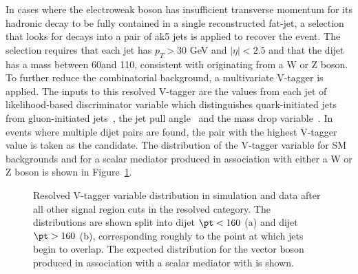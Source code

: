 In cases where the electroweak boson has insufficient transverse momentum for its hadronic
decay to be fully contained in a single reconstructed fat-jet, a selection that looks for decays 
into a pair of ak5 jets is applied to recover the event. 
The selection requires that each jet has $p_T>30$ GeV and $|\eta|<2.5$ and that the dijet has a mass between 60\gev and 110\gev, consistent with originating 
from a W or Z boson. To further reduce the combinatorial background, a
multivariate V-tagger is applied. The inputs to this resolved V-tagger are the values from each jet of likelihood-based discriminator variable 
which distinguishes quark-initiated jets from gluon-initiated
jets~\cite{JME-14-002}, the jet pull angle~\cite{Gallicchio:2010sw}
and the mass drop variable~\cite{Izaguirre:2014ira}. In events 
where multiple dijet pairs are found, the pair with the highest V-tagger value is taken as the candidate. The distribution of the V-tagger variable for SM backgrounds and for a scalar mediator
produced in association with either a W or Z boson is shown in Figure~\ref{fig:vtagger}.
\begin{figure}[hbtp]\begin{center}
 \caption{
Resolved V-tagger variable distribution in simulation and data after all other
signal region cuts in the resolved category. 
The distributions are shown split into dijet $\pt < 160$ \gev (a) and dijet
$\pt > 160$ \gev (b), corresponding roughly to the point at which jets begin to overlap. 
The expected distribution for the vector boson produced in association with a scalar mediator with is shown.} 
 \label{fig:vtagger}\end{center}\end{figure}

